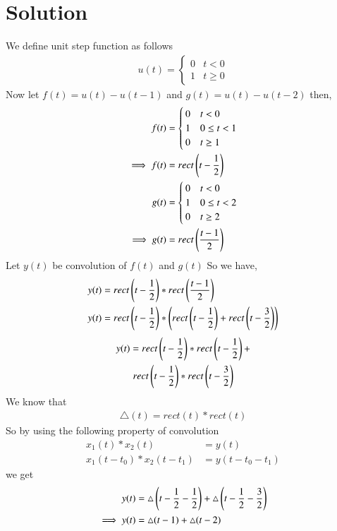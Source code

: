 \documentclass[journal,12pt,twocolumn]{IEEEtran}
\begin{document}
\section{Solution}
We define unit step function as follows 
\begin{align}
    u(t) =  \begin{cases} 
        0 & t < 0 \\
        1 & t\geq 0
   \end{cases}
\end{align}
Now let $f(t)=u(t)-u(t-1)$ and $g(t)=u(t)-u(t-2)$ then,
\begin{align}
    f(t) &=  \begin{cases} 
        0 & t < 0 \\
        1 & 0\leq t<1\\
        0 & t\geq 1
   \end{cases}\\
   \implies f(t) &= rect\left(t-\frac{1}{2}\right)\\
   g(t) &=  \begin{cases} 
        0 & t < 0 \\
        1 & 0\leq t<2\\
        0 & t\geq 2
   \end{cases}\\
   \implies g(t) &= rect\left(\frac{t-1}{2}\right)
\end{align}
Let $y(t)$ be convolution of $f(t)$ and $g(t)$ So we have,
\begin{align}
    y(t) &= rect\left(t-\frac{1}{2}\right)*rect\left(\frac{t-1}{2}\right)\\
    y(t) &= rect\left(t-\frac{1}{2}\right)*\left(rect\left(t-\frac{1}{2}\right)+rect\left(t-\frac{3}{2}\right)\right)
\end{align}
\begin{multline*}
    y(t) = rect\left(t-\frac{1}{2}\right)*rect\left(t-\frac{1}{2}\right)+\\rect\left(t-\frac{1}{2}\right)*rect\left(t-\frac{3}{2}\right)
\end{multline*}
We know that 
\begin{align}
    \triangle(t) = rect(t)*rect(t)
\end{align}
So by using the following property of convolution
\begin{align}
    x_1(t)*x_2(t) &= y(t)\\
    x_1(t-t_0)*x_2(t-t_1) &= y(t-t_0-t_1)
\end{align}
we get
\begin{align}
    y(t) &= \triangle\left(t-\frac{1}{2}-\frac{1}{2}\right)+\triangle\left(t-\frac{1}{2}-\frac{3}{2}\right)\\
    \implies y(t) &= \triangle(t-1)+\triangle(t-2)
\end{align}
\end{document}
